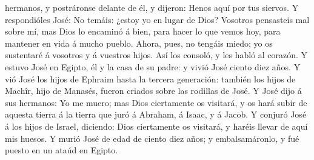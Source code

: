 hermanos, y postráronse delante de él, y dijeron: Henos aquí por tus
siervos.  Y respondióles José: No temáis: ¿estoy yo en
lugar de Dios?  Vosotros pensasteis mal sobre mí, mas
Dios lo encaminó á bien, para hacer lo que vemos hoy, para mantener en
vida á mucho pueblo.  Ahora, pues, no tengáis miedo; yo
os sustentaré á vosotros y á vuestros hijos. Así los consoló, y les
habló al corazón.  Y estuvo José en Egipto, él y la casa
de su padre: y vivió José ciento diez años.  Y vió José
los hijos de Ephraim hasta la tercera generación: también los hijos de
Machîr, hijo de Manasés, fueron criados sobre las rodillas de José.
 Y José dijo á sus hermanos: Yo me muero; mas Dios
ciertamente os visitará, y os hará subir de aquesta tierra á la tierra
que juró á Abraham, á Isaac, y á Jacob.  Y conjuró José á
los hijos de Israel, diciendo: Dios ciertamente os visitará, y haréis
llevar de aquí mis huesos.  Y murió José de edad de
ciento diez años; y embalsamáronlo, y fué puesto en un ataúd en Egipto.
